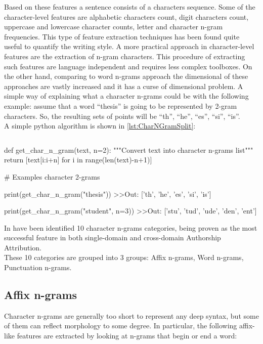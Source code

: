 Based on these features a sentence consists of a characters sequence. Some of the character-level features are alphabetic characters count, digit characters count, uppercase and lowercase character counts, letter and character n-gram frequencies. This type of feature extraction techniques has been found quite useful to quantify the writing style.\cite{grieve2007quantitative}
A more practical approach in character-level features are the extraction of n-gram characters. This procedure of extracting such features are language independent and requires less complex toolboxes. On the other hand, comparing to word n-grams approach the dimensional of these approaches are vastly increased and it has a curse of dimensional problem. A simple way of explaining what a character n-grams could be with the following example: assume that a word “thesis” is going to be represented by 2-gram characters. So, the resulting sets of points will be {\enquote{th}, \enquote{he}, \enquote{es}, \enquote{si}, \enquote{is}}.\\
A simple python algorithm is shown in \ref{lst:CharNGramSplit}:\\

\begin{lstlisting}[frame=none,caption={Split word into character n-grams, parametric on n.},captionpos=b,label=lst:CharNGramSplit]
\end{lstlisting}
\begin{python}
	def get_char_n_gram(text, n=2):
		"""Convert text into character n-grams list"""
		return [text[i:i+n] for i in range(len(text)-n+1)]
	
	# Examples character 2-grams
	
	print(get_char_n_gram("thesis"))
	>>Out: ['th', 'he', 'es', 'si', 'is']
	
	print(get_char_n_gram("student", n=3))
	>>Out: ['stu', 'tud', 'ude', 'den', 'ent']
\end{python}


In \cite{sapkota2015not} have been identified 10 character n-grams categories, being proven as the most successful feature in both single-domain and cross-domain Authorship Attribution.\\
These 10 categories are grouped into 3 groups: Affix n-grams, Word n-grams, Punctuation n-grams.

\subsection{Affix n-grams}
Character n-grams are generally too short to represent any deep syntax, but some of them can reflect morphology to some degree. In particular, the following affix-like features are extracted by looking at n-grams that begin or end a word:

